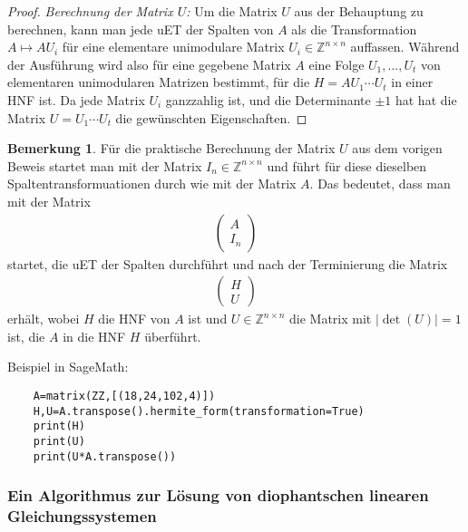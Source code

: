 \documentclass[
a4paper,12pt,
bibliography=totocnumbered,
numbers=noenddot,
]{scrartcl}
\numberwithin{equation}{subsection}
\newcommand{\Z}{\mathbb Z}
\theoremstyle{plain}
\theoremstyle{definition}
\newtheorem*{bem}{Bemerkung}
\begin{document}
\begin{proof}
	\emph{Berechnung der Matrix $U$:} Um die Matrix $U$ aus der Behauptung zu berechnen, kann man jede uET der Spalten von $A$ als die Transformation $A \mapsto A U_i$ für eine elementare unimodulare Matrix $U_i \in \Z^{n \times n}$ auffassen. Während der Ausführung wird also für eine gegebene Matrix $A$ eine Folge $U_1,\ldots,U_t$ von elementaren unimodularen Matrizen bestimmt, für die $H = A U_1 \cdots U_t$ in einer HNF ist. Da jede Matrix $U_i$ ganzzahlig ist, und die Determinante $\pm 1$ hat hat die Matrix $U = U_1 \cdots U_t$ die gewünschten Eigenschaften. 
\end{proof} 

\begin{bem} 
	Für die praktische Berechnung der Matrix $U$ aus dem vorigen Beweis startet man mit der Matrix $I_n \in \Z^{n \times n}$ und führt für diese dieselben Spaltentransformuationen durch wie mit der Matrix $A$. Das bedeutet, dass man mit der Matrix 
	\begin{align*}
			\begin{pmatrix} 
				A \\ I_n
			\end{pmatrix} 
	\end{align*} 
	startet, die uET der Spalten durchführt und nach der Terminierung die Matrix 
	\begin{align*}
		\begin{pmatrix*} 
			H \\ U
		\end{pmatrix*} 
	\end{align*} 
	erhält, wobei $H$ die HNF von $A$ ist und $U \in \Z^{n \times n}$ die Matrix mit $|\det(U)|=1$ ist, die $A$ in die HNF $H$ überführt. 
\end{bem} 

Beispiel in SageMath: 
\begin{verbatim}
	A=matrix(ZZ,[(18,24,102,4)])
	H,U=A.transpose().hermite_form(transformation=True)
	print(H)
	print(U)
	print(U*A.transpose())
\end{verbatim}


\subsubsection{Ein Algorithmus zur Lösung von diophantschen linearen Gleichungssystemen} 
\end{document}
